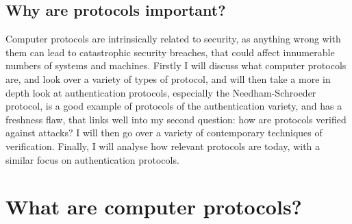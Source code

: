 \documentclass{article}
\begin{document}
\subsection{Why are protocols important?}
Computer protocols are intrinsically related to security, as anything wrong with
them can lead to catastrophic security breaches, that could affect innumerable
numbers of systems and machines. Firstly I will discuss what computer protocols
are, and look over a variety of types of protocol, and will then take a more in
depth look at authentication protocols, especially the Needham-Schroeder
protocol, is a good example of protocols of the authentication variety, and has
a freshness flaw, that links well into my second question: how are protocols
verified against attacks? I will then go over a variety of contemporary
techniques of verification. Finally, I will analyse how relevant protocols are
today, with a similar focus on authentication protocols.

\section{What are computer protocols?}
\end{document}
